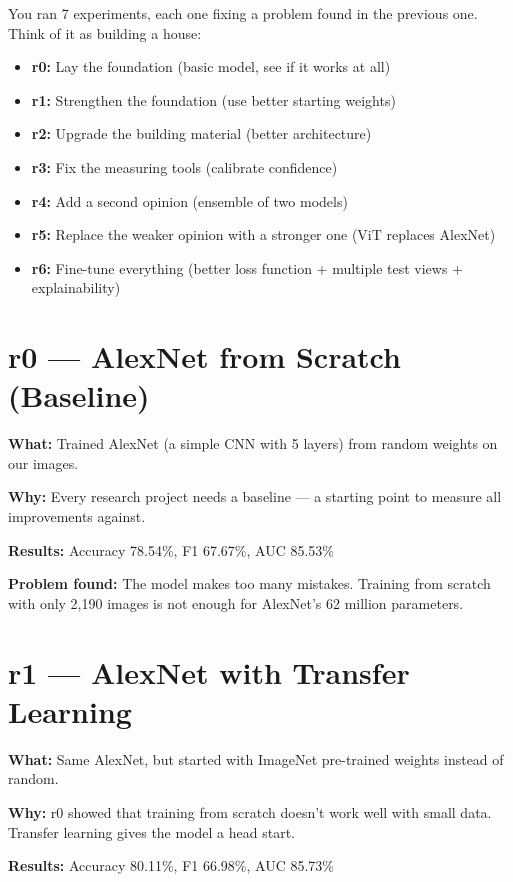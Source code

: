 \documentclass[11pt]{article}
\begin{document}
You ran 7 experiments, each one fixing a problem found in the previous one. Think of it as building a house:

\begin{itemize}[noitemsep]
    \item \textbf{r0:} Lay the foundation (basic model, see if it works at all)
    \item \textbf{r1:} Strengthen the foundation (use better starting weights)
    \item \textbf{r2:} Upgrade the building material (better architecture)
    \item \textbf{r3:} Fix the measuring tools (calibrate confidence)
    \item \textbf{r4:} Add a second opinion (ensemble of two models)
    \item \textbf{r5:} Replace the weaker opinion with a stronger one (ViT replaces AlexNet)
    \item \textbf{r6:} Fine-tune everything (better loss function + multiple test views + explainability)
\end{itemize}

\section{r0 --- AlexNet from Scratch (Baseline)}

\textbf{What:} Trained AlexNet (a simple CNN with 5 layers) from random weights on our images.

\textbf{Why:} Every research project needs a baseline --- a starting point to measure all improvements against.

\textbf{Results:} Accuracy 78.54\%, F1 67.67\%, AUC 85.53\%

\textbf{Problem found:} The model makes too many mistakes. Training from scratch with only 2,190 images is not enough for AlexNet's 62 million parameters.

\section{r1 --- AlexNet with Transfer Learning}

\textbf{What:} Same AlexNet, but started with ImageNet pre-trained weights instead of random.

\textbf{Why:} r0 showed that training from scratch doesn't work well with small data. Transfer learning gives the model a head start.

\textbf{Results:} Accuracy 80.11\%, F1 66.98\%, AUC 85.73\%
\end{document}
